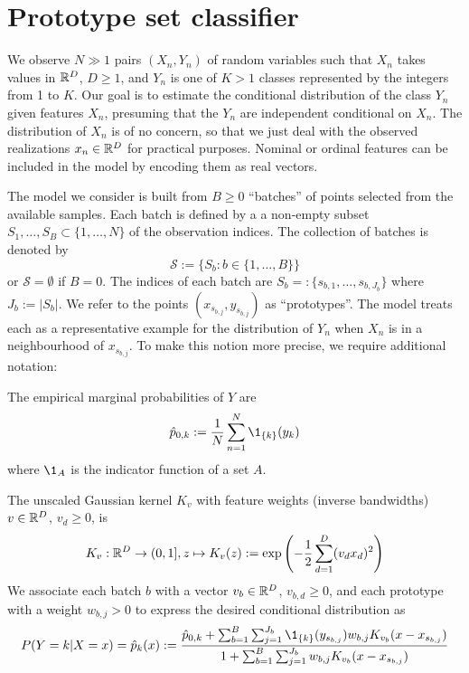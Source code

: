 \chapter{Prototype set classifier}
\label{ch_classifier}
%
We observe $N\gg1$ pairs $(X_n,Y_n)$ of random variables such that $X_n$ takes values in $\mathbb{R}^D$, $D\geq1$, and $Y_n$ is one of $K>1$ classes represented by the integers from 1 to $K$.
Our goal is to estimate the conditional distribution of the class $Y_n$ given features $X_n$, presuming that the $Y_n$ are independent conditional on $X_n$.
The distribution of $X_n$ is of no concern, so that we just deal with the observed realizations $x_n\in\mathbb{R}^D$ for practical purposes.
Nominal or ordinal features can be included in the model by encoding them as real vectors.\par
%
The model we consider is built from $B\geq0$ ``batches'' of points selected from the available samples.
Each batch is defined by a a non-empty subset $S_1,\dots,S_B\subset\{1,\dots,N\}$ of the observation indices.
The collection of batches is denoted by
%
\begin{equation}
\mathcal{S}:=\{S_b:b\in\{1,\dots,B\}\}\label{eq_batches}
\end{equation}
%
or $\mathcal{S}=\emptyset$ if $B=0$.
The indices of each batch are $S_b=:\{s_{b,1},\dots,s_{b,J_b}\}$ where $J_b:=|S_b|$.
We refer to the points $(x_{s_{b,j}},y_{s_{b,j}})$ as ``prototypes''.
The model treats each as a representative example for the distribution of $Y_n$ when $X_n$ is in a neighbourhood of $x_{s_{b,j}}$.
To make this notion more precise, we require additional notation:\par
%
The empirical marginal probabilities of $Y$ are
%
\begin{equation}
\hat{p}_{0,k}:=\frac{1}{N}\sum_{n=1}^N\1_{\{k\}}(y_k)\label{eq_p0k}
\end{equation}
%
where $\1_A$ is the indicator function of a set $A$.\par
%
The unscaled Gaussian kernel $K_v$ with feature weights (inverse bandwidths) $v\in\mathbb{R}^D$, $v_d\geq0$, is
%
\begin{equation}
K_v:\mathbb{R}^D\rightarrow(0,1],
z\mapsto K_v(z):=\exp\left(-\frac{1}{2}\sum_{d=1}^D(v_dx_d)^2\right)\label{eq_kernel}
\end{equation}
%
We associate each batch $b$ with a vector $v_b\in\mathbb{R}^D$, $v_{b,d}\geq0$, and each prototype with a weight $w_{b,j}>0$ to express the desired conditional distribution as
%
\begin{equation}
P(Y=k|X=x)=\hat{p}_k(x):=
\frac{\hat{p}_{0,k}+\sum_{b=1}^B\sum_{j=1}^{J_b}\1_{\{k\}}(y_{s_{b,j}})w_{b,j}K_{v_b}(x-x_{s_{b,j}})}
{1+\sum_{b=1}^B\sum_{j=1}^{J_b}w_{b,j}K_{v_b}(x-x_{s_{b,j}})}
\label{eq_pkx}
\end{equation}
